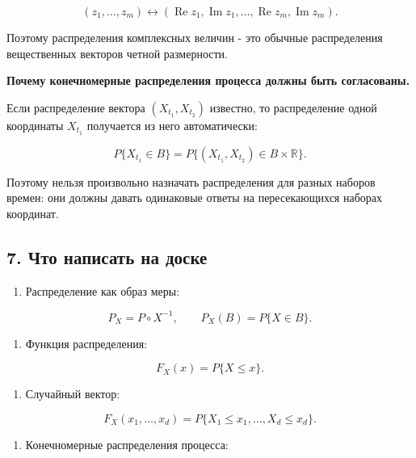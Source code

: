 \documentclass[
  11pt,
  a4paper,
]{article}
\providecommand{\tightlist}{%
  \setlength{\itemsep}{0pt}\setlength{\parskip}{0pt}}
\begin{document}
\[
(z_1,\ldots,z_m)
\leftrightarrow
(\operatorname{Re}z_1,\operatorname{Im}z_1,\ldots,\operatorname{Re}z_m,\operatorname{Im}z_m).
\]

Поэтому распределения комплексных величин - это обычные распределения
вещественных векторов четной размерности.

\textbf{Почему конечномерные распределения процесса должны быть
согласованы.}

Если распределение вектора \((X_{t_1},X_{t_2})\) известно, то
распределение одной координаты \(X_{t_1}\) получается из него
автоматически:

\[
P\{X_{t_1}\in B\}=P\{(X_{t_1},X_{t_2})\in B\times\mathbb R\}.
\]

Поэтому нельзя произвольно назначать распределения для разных наборов
времен: они должны давать одинаковые ответы на пересекающихся наборах
координат.

\subsection{7. Что написать на
доске}\label{ux447ux442ux43e-ux43dux430ux43fux438ux441ux430ux442ux44c-ux43dux430-ux434ux43eux441ux43aux435}

\begin{enumerate}
\def\labelenumi{\arabic{enumi}.}
\tightlist
\item
  Распределение как образ меры:
\end{enumerate}

\[
P_X=P\circ X^{-1},
\qquad
P_X(B)=P\{X\in B\}.
\]

\begin{enumerate}
\def\labelenumi{\arabic{enumi}.}
\setcounter{enumi}{1}
\tightlist
\item
  Функция распределения:
\end{enumerate}

\[
F_X(x)=P\{X\le x\}.
\]

\begin{enumerate}
\def\labelenumi{\arabic{enumi}.}
\setcounter{enumi}{2}
\tightlist
\item
  Случайный вектор:
\end{enumerate}

\[
F_X(x_1,\ldots,x_d)
=
P\{X_1\le x_1,\ldots,X_d\le x_d\}.
\]

\begin{enumerate}
\def\labelenumi{\arabic{enumi}.}
\setcounter{enumi}{3}
\tightlist
\item
  Конечномерные распределения процесса:
\end{enumerate}
\end{document}
